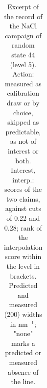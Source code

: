 \documentclass{iopjournal}
\begin{document}
{\renewcommand{\thetable}{S8.3}\small
\begin{longtable}[]{@{}
  >{\raggedright\arraybackslash}p{}
  >{\raggedright\arraybackslash}p{}
  >{\raggedright\arraybackslash}p{}
  >{\raggedright\arraybackslash}p{}
  >{\raggedright\arraybackslash}p{}
  >{\raggedright\arraybackslash}p{}
  >{\raggedright\arraybackslash}p{}
  >{\raggedright\arraybackslash}p{}
  >{\raggedright\arraybackslash}p{}@{}}
\caption{Excerpt of the record of the NaCl campaign of random state 44 (level 5). Action: measured as calibration draw or by choice, skipped as predictable, as not of interest or both. Interest, interp.: scores of the two claims, against cuts of 0.22 and 0.28; rank of the interpolation score within the level in brackets. Predicted and measured (200) widths in nm\ensuremath{^{-1}}; "none" marks a predicted or measured absence of the line.}\label{tab:S8.3}\\


\end{longtable}}
\end{document}
